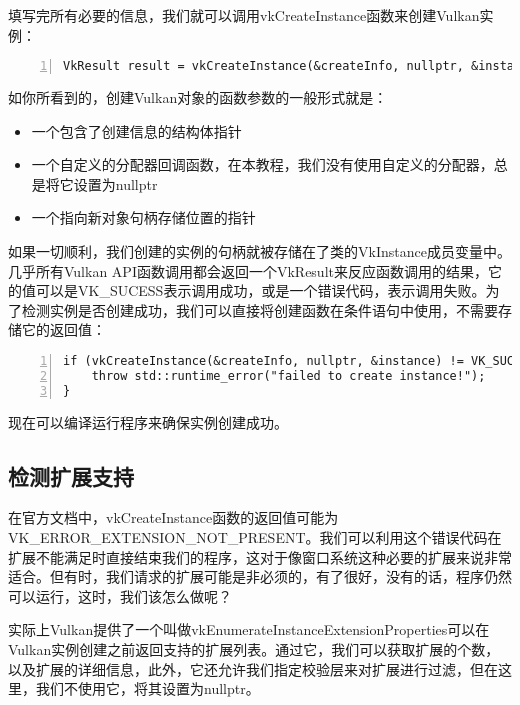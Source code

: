 \documentclass{ctexart}
\begin{document}
填写完所有必要的信息，我们就可以调用vkCreateInstance函数来创建Vulkan实例：

\begin{lstlisting}[language={[ANSI]C},keywordstyle=\color{blue!70},commentstyle=\color{red!50!green!50!blue!50},frame=shadowbox, rulesepcolor=\color{red!20!green!20!blue!20},basicstyle=\small,numbers=left, numberstyle=\tiny,breaklines=true]
VkResult result = vkCreateInstance(&createInfo, nullptr, &instance);
\end{lstlisting}

如你所看到的，创建Vulkan对象的函数参数的一般形式就是：

\begin{itemize}
	\item 一个包含了创建信息的结构体指针
	\item 一个自定义的分配器回调函数，在本教程，我们没有使用自定义的分配器，总是将它设置为nullptr
	\item 一个指向新对象句柄存储位置的指针
\end{itemize}

如果一切顺利，我们创建的实例的句柄就被存储在了类的VkInstance成员变量中。几乎所有Vulkan API函数调用都会返回一个VkResult来反应函数调用的结果，它的值可以是VK\_SUCESS表示调用成功，或是一个错误代码，表示调用失败。为了检测实例是否创建成功，我们可以直接将创建函数在条件语句中使用，不需要存储它的返回值：

\begin{lstlisting}[language={[ANSI]C},keywordstyle=\color{blue!70},commentstyle=\color{red!50!green!50!blue!50},frame=shadowbox, rulesepcolor=\color{red!20!green!20!blue!20},basicstyle=\small,numbers=left, numberstyle=\tiny,breaklines=true]
if (vkCreateInstance(&createInfo, nullptr, &instance) != VK_SUCCESS) {
	throw std::runtime_error("failed to create instance!");
}
\end{lstlisting}

现在可以编译运行程序来确保实例创建成功。

\subsection{检测扩展支持}

在官方文档中，vkCreateInstance函数的返回值可能为VK\_ERROR\_EXTENSION\_NOT\_PRESENT。我们可以利用这个错误代码在扩展不能满足时直接结束我们的程序，这对于像窗口系统这种必要的扩展来说非常适合。但有时，我们请求的扩展可能是非必须的，有了很好，没有的话，程序仍然可以运行，这时，我们该怎么做呢？

实际上Vulkan提供了一个叫做vkEnumerateInstanceExtensionProperties可以在Vulkan实例创建之前返回支持的扩展列表。通过它，我们可以获取扩展的个数，以及扩展的详细信息，此外，它还允许我们指定校验层来对扩展进行过滤，但在这里，我们不使用它，将其设置为nullptr。
\end{document}
